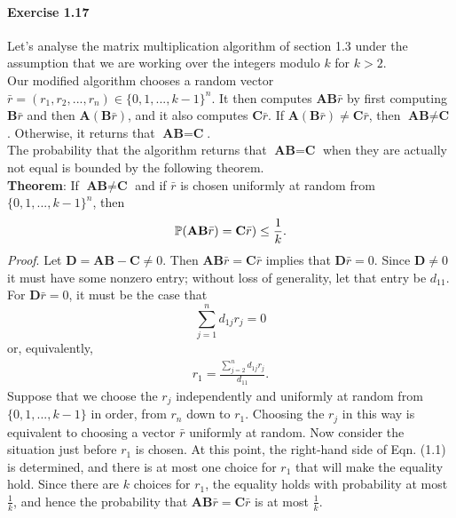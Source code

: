 \paragraph{Exercise 1.17} Let's analyse the matrix multiplication algorithm of
section 1.3 under the assumption that we are working over the integers modulo $k$
for $k > 2$. \\
Our modified algorithm chooses a random vector $\bar{r} = (r_1, r_2, ..., r_n)
\in \{ 0, 1, ..., k-1 \} ^n$. It then computes $\textbf{AB}\bar{r}$ by first
computing $\textbf{B}\bar{r}$ and then $\textbf{A}(\textbf{B} \bar{r})$, and it
also computes $\textbf{C} \bar{r}$. If $\textbf{A}(\textbf{B}\bar{r}) \not=
\textbf{C}\bar{r}$, then $\textbf{AB} \not= \textbf{C}$. Otherwise, it returns
that $\textbf{AB} = \textbf{C}$. \\
The probability that the algorithm returns that $\textbf{AB} = \textbf{C}$ when
they are actually not equal is bounded by the following theorem. \\
\textbf{Theorem}: If $\textbf{AB} \not= \textbf{C}$ and if $\bar{r}$ is chosen
uniformly at random from $\{ 0, 1, ..., k-1 \} ^n$, then
\[ \mathbb{P}(\textbf{AB}\bar{r}) = \textbf{C}\bar{r}) \leq \frac{1}{k}. \]
\textit{Proof}. Let $\textbf{D} = \textbf{AB} - \textbf{C} \not= 0$. Then
$\textbf{AB}\bar{r} = \textbf{C}\bar{r}$ implies that $\textbf{D}\bar{r} = 0$.
Since $\textbf{D} \not= 0$ it must have some nonzero entry; without loss of
generality, let that entry be $d_{11}$. \\
For $\textbf{D}\bar{r} = 0$, it must be the case that
\[ \sum_{j=1}^n d_{1j}r_j = 0 \]
or, equivalently,
\begin{align} r_1 = \frac{\sum_{j=2}^n d_{1j}r_j}{d_{11}}. \end{align}
Suppose that we choose the $r_j$ independently and uniformly at random from
$\{ 0, 1, ..., k-1 \}$ in order, from $r_n$ down to $r_1$. Choosing the $r_j$ in
this way is equivalent to choosing a vector $\bar{r}$ uniformly at random. Now
consider the situation just before $r_1$ is chosen. At this point, the right-hand
side of Eqn. (1.1) is determined, and there is at most one choice for $r_1$ that
will make the equality hold. Since there are $k$ choices for $r_1$, the equality
holds with probability at most $\frac{1}{k}$, and hence the probability that
$\textbf{AB}\bar{r} = \textbf{C}\bar{r}$ is at most $\frac{1}{k}$.
